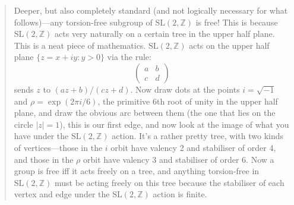 \documentclass{article}
\begin{document}
\begin{quote}
Deeper, but also completely standard (and not logically necessary for
what follows)---any torsion-free subgroup of
\(\mathrm{SL}(2,\mathbb{Z})\) is free! This is because
\(\mathrm{SL}(2,\mathbb{Z})\) acts very naturally on a certain tree in
the upper half plane. This is a neat piece of mathematics.
\(\mathrm{SL}(2,\mathbb{Z})\) acts on the upper half plane
\(\{z=x+iy:y>0\}\) via the rule: \[
  \left(\begin{array}{cc}a&b\\c&d\end{array}\right)
\] sends \(z\) to \((az+b)/(cz+d)\). Now draw dots at the points
\(i=\sqrt{-1}\) and \(\rho=\exp(2\pi i/6)\), the primitive 6th root of
unity in the upper half plane, and draw the obvious arc between them
(the one that lies on the circle \(|z|=1\)), this is our first edge, and
now look at the image of what you have under the
\(\mathrm{SL}(2,\mathbb{Z})\) action. It's a rather pretty tree, with
two kinds of vertices---those in the \(i\) orbit have valency 2 and
stabiliser of order 4, and those in the \(\rho\) orbit have valency 3
and stabiliser of order 6. Now a group is free iff it acts freely on a
tree, and anything torsion-free in \(\mathrm{SL}(2,\mathbb{Z})\) must be
acting freely on this tree because the stabiliser of each vertex and
edge under the \(\mathrm{SL}(2,\mathbb{Z})\) action is finite.


\end{quote}
\end{document}
